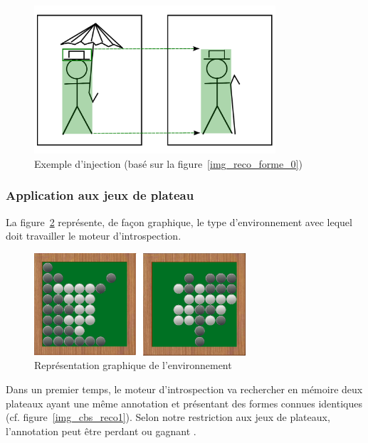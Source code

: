 \begin{figure}[H] 
\begin{center}
\includegraphics[width=0.8\textwidth]{files/raisonneur/reconnaissance_de_formes_injection} 
\end{center}
\caption{Exemple d'injection (basé sur la figure~\ref{img_reco_forme_0})}
\label{img_reco_forme_injection}
\end{figure}

\subsubsection{Application aux jeux de plateau}
\label{subsection_introspection_jeux}


La figure~\ref{img_cbs_reco0} représente, de façon graphique, le type d'environnement avec lequel doit travailler le moteur d'introspection.

\begin{figure}[H] 
\begin{center}
\includegraphics[width=0.7\textwidth]{files/raisonneur/cbs_reco0} 
\end{center}
\caption{Représentation graphique de l'environnement}
\label{img_cbs_reco0}
\end{figure}

Dans un premier temps, le moteur d'introspection va rechercher en mémoire deux plateaux ayant une même annotation et présentant des formes connues identiques (cf. figure~\ref{img_cbs_reco1}). Selon notre restriction aux jeux de plateaux, l'annotation peut être \og perdant \fg{} ou \og gagnant \fg{}.

